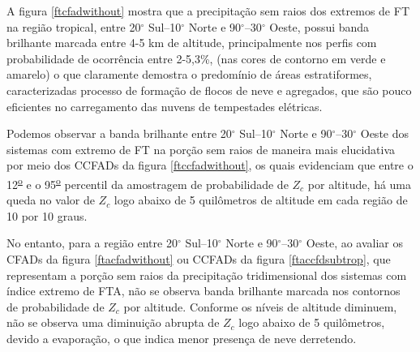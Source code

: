 


A figura \ref{ftcfadwithout} mostra que a precipitação sem raios dos extremos de FT na região tropical, entre 20$^{\circ}$ Sul--10$^{\circ}$ Norte e 90$^{\circ}$--30$^{\circ}$ Oeste, possui banda brilhante marcada entre 4-5 km de altitude, principalmente nos perfis com probabilidade de ocorrência entre 2-5,3\%, (nas cores de contorno em verde e amarelo) o que claramente demostra o predomínio de áreas estratiformes, caracterizadas processo de formação de flocos de neve e agregados, que são pouco eficientes no carregamento das nuvens de tempestades elétricas. 

Podemos observar a banda brilhante entre 20$^{\circ}$ Sul--10$^{\circ}$ Norte e 90$^{\circ}$--30$^{\circ}$ Oeste  dos sistemas com  extremo de FT na porção sem raios de maneira mais elucidativa por meio dos CCFADs da figura \ref{ftccfadwithout}, os quais evidenciam que entre o 12\textsuperscript{\underline{o}} e o 95\textsuperscript{\underline{o}} percentil da amostragem de probabilidade de $Z_c$ por altitude, há uma queda no valor de $Z_c$ logo abaixo de 5 quilômetros de altitude em cada região de 10 por 10 graus. 

No entanto, para a região entre 20$^{\circ}$ Sul--10$^{\circ}$ Norte e 90$^{\circ}$--30$^{\circ}$ Oeste, ao avaliar os CFADs da figura \ref{ftacfadwithout} ou CCFADs da figura \ref{ftaccfdsubtrop}, que representam a porção sem raios da precipitação tridimensional dos sistemas com índice extremo de FTA, não se observa banda brilhante marcada nos contornos de probabilidade de $Z_c$ por altitude. Conforme os níveis de altitude diminuem, não se observa uma diminuição abrupta de $Z_c$ logo abaixo de 5 quilômetros, devido a evaporação, o que indica menor presença de neve derretendo.

